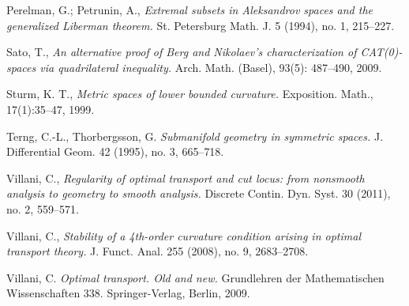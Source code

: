 \documentclass{article}
\begin{document}
\begin{thebibliography}{52}
 Perelman, G.; Petrunin, A., \emph{Extremal subsets in Aleksandrov spaces and the generalized Liberman theorem.} St. Petersburg Math. J. 5 (1994), no. 1, 215--227.

 Sato, T., \emph{An alternative proof of Berg and Nikolaev’s characterization of CAT(0)-spaces via quadrilateral inequality.} Arch. Math. (Basel), 93(5):  487--490, 2009.

  Sturm, K. T., \emph{Metric spaces of lower bounded curvature.} Exposition. Math., 17(1):35–47, 1999.


  Terng, C.-L.,  Thorbergsson, G.
\emph{Submanifold geometry in symmetric spaces.} J. Differential Geom. 42 (1995), no. 3, 665--718.

 Villani, C., \emph{Regularity of optimal transport and cut locus: from nonsmooth analysis to geometry to smooth analysis.} Discrete Contin. Dyn. Syst. 30 (2011), no. 2, 559–571. 
 
 Villani, C., \emph{Stability of a 4th-order curvature condition arising in optimal transport theory.}
J. Funct. Anal. 255 (2008), no. 9, 2683--2708.

 
  Villani, C. \emph{Optimal transport. Old and new.} Grundlehren der Mathematischen Wissenschaften 338. Springer-Verlag, Berlin, 2009.
\end{thebibliography}


%
\end{document}
